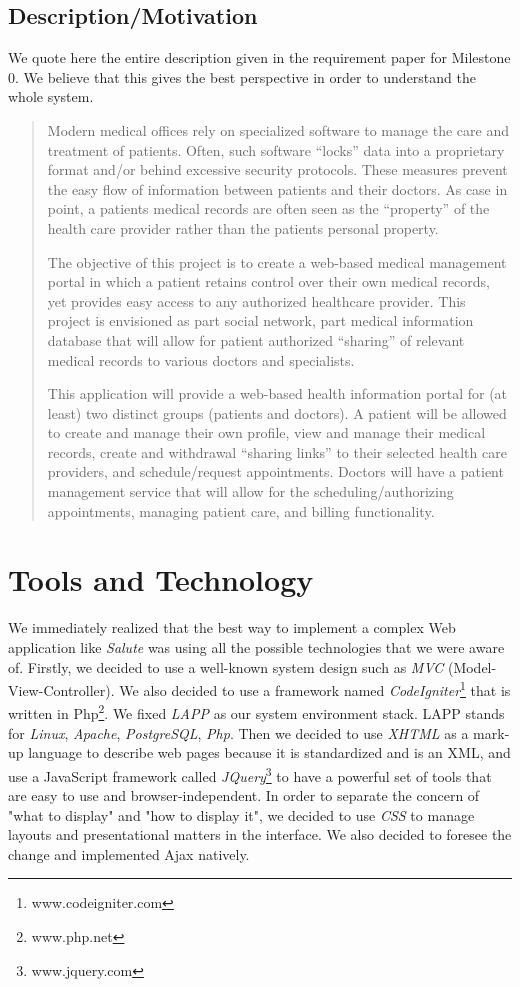 \documentclass[10pt]{report}
\begin{document}
\section{Description/Motivation}
We quote here the entire description given in the requirement paper for Milestone 0. We believe that this gives the best perspective in order to understand the whole system.
\begin{quotation}
   Modern medical offices rely on specialized software to manage the care and treatment of patients. Often,
such software “locks” data into a proprietary format and/or behind excessive security protocols. These
measures prevent the easy flow of information between patients and their doctors. As case in point, a
patients medical records are often seen as the “property” of the health care provider rather than the patients
personal property.
   
   The objective of this project is to create a web-based medical management portal in which a patient retains
control over their own medical records, yet provides easy access to any authorized healthcare provider. This
project is envisioned as part social network, part medical information database that will allow for patient
authorized “sharing” of relevant medical records to various doctors and specialists.
   
   This application will provide a web-based health information portal for (at least) two distinct groups
(patients and doctors). A patient will be allowed to create and manage their own profile, view and manage
their medical records, create and withdrawal “sharing links” to their selected health care providers, and
schedule/request appointments. Doctors will have a patient management service that will allow for the
scheduling/authorizing appointments, managing patient care, and billing functionality.
\end{quotation}


\chapter{Tools and Technology}
We immediately realized that the best way to implement a complex Web application like \emph{Salute} was using all the possible technologies that we were aware of. Firstly, we decided to use a well-known system design such as \emph{MVC} (Model-View-Controller). We also decided to use a framework named \emph{CodeIgniter}\footnote{www.codeigniter.com} that is written in Php\footnote{www.php.net}. We fixed \emph{LAPP} as our system environment stack. LAPP stands for \emph{Linux}, \emph{Apache}, \emph{PostgreSQL}, \emph{Php}. Then we decided to use \emph{XHTML} as a mark-up language to describe web pages because it is standardized and is an XML, and use a JavaScript framework called \emph{JQuery}\footnote{www.jquery.com} to have a powerful set of tools that are easy to use and browser-independent. In order to separate the concern of "what to display" and "how to display it", we decided to use \emph{CSS} to manage layouts and presentational matters in the interface. We also decided to foresee the change and implemented Ajax natively.
\end{document}
